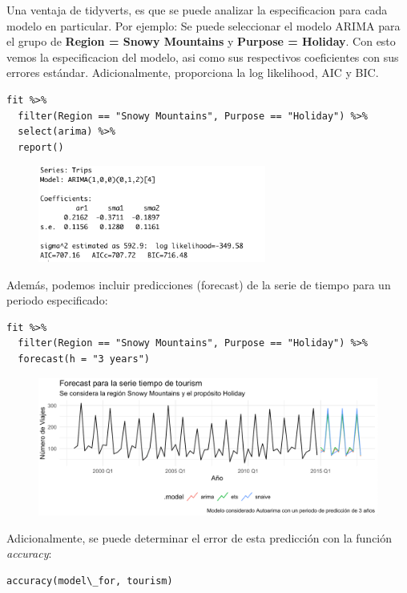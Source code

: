 \newpage

Una ventaja de tidyverts, es que se puede analizar la especificacion para cada modelo en particular. Por ejemplo: Se puede seleccionar el modelo ARIMA para el grupo de \textbf{Region = Snowy Mountains} y \textbf{Purpose = Holiday}. Con esto vemos la especificacion del modelo, asi como sus respectivos  coeficientes con sus errores estándar. Adicionalmente, proporciona la log likelihood, AIC y BIC.

\begin{lstlisting}
fit %>%
  filter(Region == "Snowy Mountains", Purpose == "Holiday") %>%
  select(arima) %>%
  report()
\end{lstlisting}

\begin{figure}[!h]
        \includegraphics[width=75mm]{imgs/05_fit_arima.png}
\end{figure}

Además, podemos incluir predicciones (forecast) de la serie de tiempo para un periodo especificado:

\begin{lstlisting}
fit %>%
  filter(Region == "Snowy Mountains", Purpose == "Holiday") %>%
  forecast(h = "3 years")
\end{lstlisting}

\begin{figure}[!h]
        \includegraphics[width=120mm]{imgs/08_arima_plot.png}
\end{figure}

Adicionalmente, se puede determinar el error de esta predicción con la función \textit{accuracy}:

\begin{lstlisting}
accuracy(model\_for, tourism)
\end{lstlisting}

